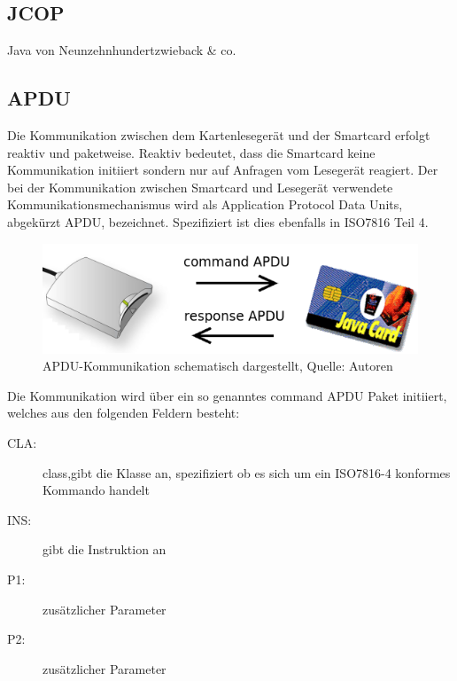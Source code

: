 \documentclass[a4paper,12pt]{scrartcl}
\begin{document}
\subsection{JCOP}
\label{subsec:2.2}
Java von Neunzehnhundertzwieback \& co.

\subsection{APDU}
\label{subsec:2.3}

Die Kommunikation zwischen dem Kartenlesegerät und der Smartcard erfolgt reaktiv und paketweise. Reaktiv bedeutet, dass die Smartcard keine Kommunikation initiiert sondern nur auf Anfragen vom Lesegerät reagiert. Der bei der Kommunikation zwischen Smartcard und Lesegerät verwendete Kommunikationsmechanismus wird als Application Protocol Data Units, abgekürzt APDU, bezeichnet. Spezifiziert ist dies ebenfalls in ISO7816 Teil 4.\cite{iso7816}
\\

\begin{figure}[htb]
\begin{center}
 \includegraphics[width=1\hsize]{./images/apdu.png}
\end{center}
\caption[APDU-Kommunikation schematisch dargestellt, Quelle: Autoren]{\label{apdu}APDU-Kommunikation schematisch dargestellt, Quelle: Autoren}
\end{figure}

Die Kommunikation wird über ein so genanntes command APDU Paket initiiert, welches aus den folgenden Feldern besteht:


\begin{description}
\item[CLA:] class,gibt die Klasse an, spezifiziert ob es sich um ein ISO7816-4 konformes Kommando handelt
\item[INS:] gibt die Instruktion an
\item[P1:] zusätzlicher Parameter
\item[P2:] zusätzlicher Parameter
\end{description} 
\end{document}
